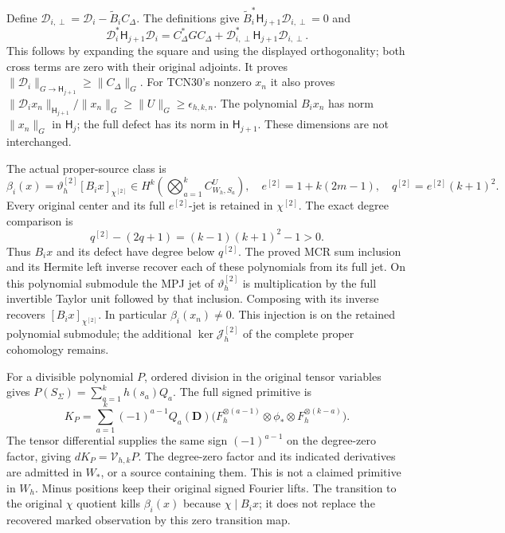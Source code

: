 \documentclass[11pt,a4paper]{article}
\begin{document}
Define $\mathcal D_{i,\perp}=\mathcal D_i-\widetilde B_iC_\Delta$.
The definitions give
$\widetilde B_i^*\mathsf H_{j+1}\mathcal D_{i,\perp}=0$ and
\begin{equation}\tag{TCD2}
 \mathcal D_i^*\mathsf H_{j+1}\mathcal D_i
 =C_\Delta^*GC_\Delta+
        \mathcal D_{i,\perp}^*\mathsf H_{j+1}\mathcal D_{i,\perp}.
\end{equation}
This follows by expanding the square and using the displayed
orthogonality; both cross terms are zero with their original adjoints.
It proves
$\|\mathcal D_i\|_{G\to\mathsf H_{j+1}}\ge\|C_\Delta\|_G$.
For TCN30's nonzero $x_n$ it also proves
$\|\mathcal D_ix_n\|_{\mathsf H_{j+1}}/\|x_n\|_G
\ge\|U\|_G\ge\epsilon_{h,k,n}$.
The polynomial $B_ix_n$ has norm $\|x_n\|_G$ in $\mathsf H_j$;
the full defect has its norm in $\mathsf H_{j+1}$. These dimensions
are not interchanged.

The actual proper-source class is
\begin{equation}\tag{TCD3}
 \beta_i(x)=\vartheta_h^{[2]}[B_ix]_{\chi^{[2]}}
       \in H^k\!\left(\bigotimes_{a=1}^k C^U_{W_h,S_a}\right),
 \quad e^{[2]}=1+k(2m-1),\quad q^{[2]}=e^{[2]}(k+1)^2.
\end{equation}
Every original center and its full $e^{[2]}$-jet is retained in
$\chi^{[2]}$. The exact degree comparison is
\[
 q^{[2]}-(2q+1)=(k-1)(k+1)^2-1>0.
\]
Thus $B_ix$ and its defect have degree below $q^{[2]}$. The proved
MCR sum inclusion and its Hermite left inverse recover each of these
polynomials from its full jet. On this polynomial submodule the MPJ
jet of $\vartheta_h^{[2]}$ is multiplication by the full invertible
Taylor unit followed by that inclusion. Composing with its inverse
recovers $[B_ix]_{\chi^{[2]}}$. In particular $\beta_i(x_n)\ne0$.
This injection is on the retained polynomial submodule; the additional
$\ker\mathcal J_h^{[2]}$ of the complete proper cohomology remains.

For a divisible polynomial $P$, ordered division in the original
tensor variables gives $P(S_\Sigma)=\sum_{a=1}^k h(s_a)Q_a$.
The full signed primitive is
\begin{equation}\tag{TCD4}
 K_P=\sum_{a=1}^k(-1)^{a-1}Q_a(\mathbf D)
 \bigl(F_h^{\otimes(a-1)}\otimes\phi_*
                         \otimes F_h^{\otimes(k-a)}\bigr).
\end{equation}
The tensor differential supplies the same sign $(-1)^{a-1}$ on
the degree-zero factor, giving $dK_P=\mathcal V_{h,k}P$.
The degree-zero factor and its indicated derivatives are admitted in
$W_*$, or a source containing them. This is not a claimed primitive
in $W_h$. Minus positions keep their original signed Fourier lifts.
The transition to the original $\chi$ quotient kills $\beta_i(x)$
because $\chi\mid B_ix$; it does not replace the recovered marked
observation by this zero transition map.
\end{document}
